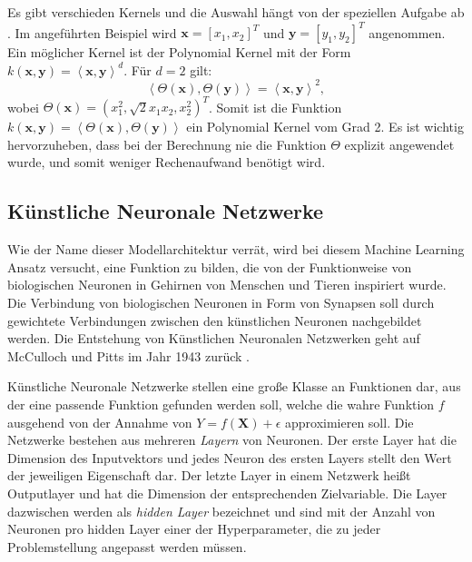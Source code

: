 Es gibt verschieden Kernels und die Auswahl h\"angt von der speziellen Aufgabe ab \cite{SVM1}. Im angef\"uhrten Beispiel wird $ \mathbf{x} = [x_1, x_2]^T$ und $\mathbf{y} = [y_1, y_2]^T$ angenommen.
Ein m\"oglicher Kernel ist der Polynomial Kernel mit der Form
$k(\mathbf{x}, \mathbf{y}) = \left\langle \mathbf{x}, \mathbf{y} \right\rangle^d$. F\"ur $d=2$ gilt:
$$ \left\langle \Theta(\mathbf{x}), \Theta(\mathbf{y}) \right\rangle = \left\langle \mathbf{x}, \mathbf{y} \right\rangle^2, $$
wobei $\Theta(\mathbf{x}) = (x_1^2, \sqrt{2}x_1x_2, x_2^2)^T$.
Somit ist die Funktion $k(\mathbf{x}, \mathbf{y}) = \left\langle \Theta(\mathbf{x}), \Theta(\mathbf{y}) \right\rangle$
ein Polynomial Kernel vom Grad 2. Es ist wichtig hervorzuheben, dass bei der Berechnung nie die Funktion $\Theta$ explizit angewendet wurde,
und somit weniger Rechenaufwand ben\"otigt wird.































\subsection{K\"unstliche Neuronale Netzwerke}
Wie der Name dieser Modellarchitektur verr\"at, wird bei diesem Machine Learning Ansatz versucht, eine Funktion zu bilden, die von der Funktionweise
von biologischen Neuronen in Gehirnen von Menschen und Tieren inspiriert wurde. Die Verbindung von biologischen Neuronen in Form von Synapsen soll durch gewichtete
Verbindungen zwischen den k\"unstlichen Neuronen nachgebildet werden. Die Entstehung von K\"unstlichen Neuronalen Netzwerken
geht auf McCulloch und Pitts im Jahr 1943 zur\"uck \cite{McCulloch}.

K\"unstliche Neuronale Netzwerke stellen eine gro{\ss}e Klasse an Funktionen dar, aus der eine passende Funktion gefunden werden soll, welche
die wahre Funktion $f$ ausgehend von der Annahme von $Y = f(\mathbf{X}) + \epsilon$ approximieren soll. Die Netzwerke bestehen aus mehreren \textit{Layern} von Neuronen. Der erste Layer hat
die Dimension des Inputvektors und jedes Neuron des ersten Layers stellt den Wert der jeweiligen Eigenschaft dar. Der letzte Layer in einem Netzwerk hei{\ss}t
Outputlayer und hat die Dimension der entsprechenden Zielvariable. Die Layer dazwischen werden als \textit{hidden Layer} bezeichnet und sind mit der Anzahl von Neuronen pro
hidden Layer einer der Hyperparameter, die zu jeder Problemstellung angepasst werden m\"ussen.

